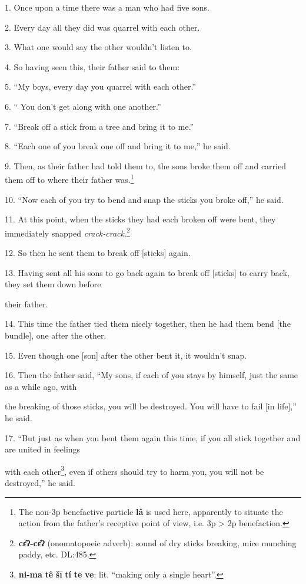 \setcounter{footnote}{0}

1. Once upon a time there was a man who had five sons.

2. Every day all they did was quarrel with each other.

3. What one would say the other wouldn't listen to.

4. So having seen this, their father said to them:

5. ``My boys, every day you quarrel with each other.''

6. `` You don't get along with one another.''

7. ``Break off a stick from a tree and bring it to me.''

8. ``Each one of you break one off and bring it to me,'' he said.

9. Then, as their father had told them to, the sons broke them off and carried
them off to where their father was.\footnote{The non-3p benefactive particle \textbf{lâ} is used here, apparently to situate the action from the father's receptive point of view, i.e. 3p > 2p benefaction.}

10. ``Now each of you try to bend and snap the sticks you broke off,'' he said.

11. At this point, when the sticks they had each broken off were bent, they immediately
snapped \textit{crack-crack}.\footnote{\textbf{cɛ̂ʔ-cɛ̂ʔ} (onomatopoeic adverb): sound of dry sticks breaking, mice munching paddy, etc. DL:485.}

12. So then he sent them to break off [sticks] again.

13. Having sent all his sons to go back again to break off [sticks] to carry back,
they set them down before

their father.

14. This time the father tied them nicely together, then he had them bend [the
bundle], one after the other.

15. Even though one [son] after the other bent it, it wouldn't snap.

16. Then the father said, ``My sons, if each of you stays by himself, just the
same as a while ago, with

the breaking of those sticks, you will be destroyed. You will have to fail [in
life],'' he said.

17. ``But just as when you bent them again this time, if you all stick together
and are united in feelings

with each other\footnote{\textbf{ni-ma} \textbf{tê} \textbf{šī} \textbf{tí} \textbf{te} \textbf{ve}: lit. ``making only a single heart''.}, even if others should try to harm you, you will not be destroyed,''
he said.

